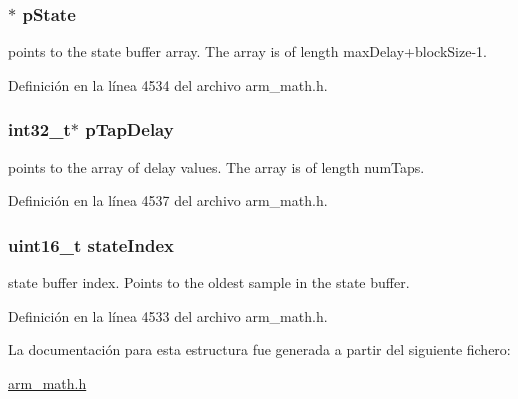 \subsubsection[{\texorpdfstring{p\+State}{pState}}]{$\ast$ p\+State}\hypertarget{structarm__fir__sparse__instance__q7_aa8f67102521b620af6f259afdcf29785}{}\label{structarm__fir__sparse__instance__q7_aa8f67102521b620af6f259afdcf29785}
points to the state buffer array. The array is of length max\+Delay+block\+Size-\/1. 

Definición en la línea 4534 del archivo arm\+\_\+math.\+h.

\subsubsection[{\texorpdfstring{p\+Tap\+Delay}{pTapDelay}}]{\setlength{\rightskip}{0pt plus 5cm}int32\+\_\+t$\ast$ p\+Tap\+Delay}\hypertarget{structarm__fir__sparse__instance__q7_adec00b3793ab4f08edfeb4ea6a9eb6e6}{}\label{structarm__fir__sparse__instance__q7_adec00b3793ab4f08edfeb4ea6a9eb6e6}
points to the array of delay values. The array is of length num\+Taps. 

Definición en la línea 4537 del archivo arm\+\_\+math.\+h.

\subsubsection[{\texorpdfstring{state\+Index}{stateIndex}}]{\setlength{\rightskip}{0pt plus 5cm}uint16\+\_\+t state\+Index}\hypertarget{structarm__fir__sparse__instance__q7_a566a0cb53437e48b9a3bf18e5b03d8aa}{}\label{structarm__fir__sparse__instance__q7_a566a0cb53437e48b9a3bf18e5b03d8aa}
state buffer index. Points to the oldest sample in the state buffer. 

Definición en la línea 4533 del archivo arm\+\_\+math.\+h.



La documentación para esta estructura fue generada a partir del siguiente fichero\+:\begin{DoxyCompactItemize}
\item 
\hyperlink{arm__math_8h}{arm\+\_\+math.\+h}\end{DoxyCompactItemize}

